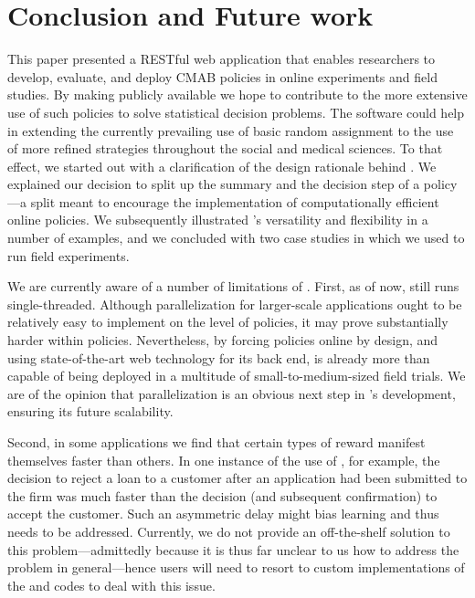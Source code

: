 \documentclass[nojss]{jss}
\begin{document}
\section{Conclusion and Future work}
\label{sec:discussion}
This paper presented  a RESTful web application that enables researchers to develop, evaluate, and deploy CMAB policies in online experiments and field studies. By making  publicly available we hope to contribute to the more extensive use of such policies to solve statistical decision problems. The software could help in extending the currently prevailing use of basic random assignment to the use of more refined strategies throughout the social and medical sciences. To that effect, we started out with a clarification of the design rationale behind . We explained	our decision to split up the summary and the decision step of a policy---a split meant to encourage the implementation of computationally efficient online policies. We subsequently illustrated 's versatility and flexibility in a number of examples, and we concluded with two case studies in which we used  to run field experiments.

We are currently aware of a number of limitations of . First, as of now,  still runs single-threaded. Although parallelization for larger-scale applications ought to be relatively easy to implement on the level of policies, it may prove substantially harder within policies. Nevertheless, by forcing policies online by design, and using state-of-the-art web technology for its back end,  is already more than capable of being deployed in a multitude of small-to-medium-sized field trials. We are of the opinion that parallelization is an obvious next step in 's development, ensuring its future scalability.

Second, in some applications we find that certain types of reward manifest themselves faster than others. In one instance of the use of , for example, the decision to reject a loan to a customer after an application had been submitted to the firm was much faster than the decision (and subsequent confirmation) to accept the customer. Such an asymmetric delay might bias learning and thus needs to be addressed. Currently, we do not provide an off-the-shelf solution to this problem---admittedly because it is thus far unclear to us how to address the problem in general---hence users will need to resort to custom implementations of the  and  codes to deal with this issue.
\end{document}
